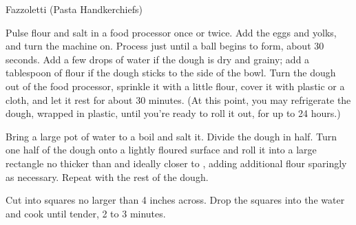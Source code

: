 \begin{recipe}[\vegetarian]{Fazzoletti (Pasta Handkerchiefs)}
    \label{fazzoletti}

    \begin{ingredients}
    \end{ingredients}

    \begin{instructions}
        Pulse flour and salt in a food processor once or twice.
        Add the eggs and yolks, and turn the machine on.
        Process just until a ball begins to form, about 30 seconds.
        Add a few drops of water if the dough is dry and grainy; add a tablespoon of flour if the dough sticks to the side of the bowl.
        Turn the dough out of the food processor, sprinkle it with a little flour, cover it with plastic or a cloth, and let it rest for about 30 minutes.
        (At this point, you may refrigerate the dough, wrapped in plastic, until you’re ready to roll it out, for up to 24 hours.)

        Bring a large pot of water to a boil and salt it.
        Divide the dough in half.
        Turn one half of the dough onto a lightly floured surface and roll it into a large rectangle no thicker than \quarter\inch and ideally closer to \eighth\inch, adding additional flour sparingly as necessary.
        Repeat with the rest of the dough.

        Cut into squares no larger than 4 inches across.
        Drop the squares into the water and cook until tender, 2 to 3 minutes.
    \end{instructions}
\end{recipe}
